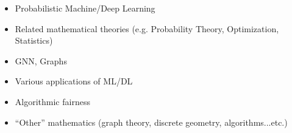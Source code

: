 \documentclass[10pt,a4]{article}
\begin{document}
\begin{small}
\begin{itemize}{}{}
\item Probabilistic Machine/Deep Learning

\item Related mathematical theories (e.g. Probability Theory, Optimization, Statistics)

\item GNN, Graphs

\item Various applications of ML/DL

\item Algorithmic fairness

\item ``Other'' mathematics (graph theory, discrete geometry, algorithms...etc.)
\end{itemize}
%
%
%

\end{small}
\end{document}

